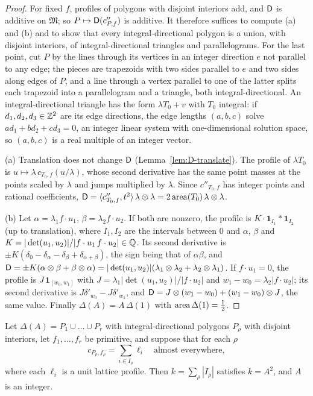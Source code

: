 \documentclass[11pt]{amsart}
\begin{document}
\begin{proof}
For fixed $f$, profiles of polygons with disjoint interiors add, and $\mathsf{D}$ is additive on $\mathfrak M$; so
$P\mapsto\mathsf{D}(c''_{P,f})$ is additive. It therefore suffices to compute (a) and (b) and to show that every
integral-directional polygon is a union, with disjoint interiors, of integral-directional triangles and
parallelograms. For the last point, cut $P$ by the lines through its vertices in an integer direction $e$ not
parallel to any edge; the pieces are trapezoids with two sides parallel to $e$ and two sides along edges of $P$, and
a line through a vertex parallel to one of the latter splits each trapezoid into a parallelogram and a triangle,
both integral-directional. An integral-directional triangle has the form $\lambda T_0+v$ with $T_0$ integral: if
$d_1,d_2,d_3\in\mathbb{Z}^2$ are its edge directions, the edge lengths $(a,b,c)$ solve $ad_1+bd_2+cd_3=0$, an integer linear
system with one-dimensional solution space, so $(a,b,c)$ is a real multiple of an integer vector.

(a) Translation does not change $\mathsf{D}$ (Lemma~\ref{lem:D-translate}). The profile of $\lambda T_0$ is
$u\mapsto\lambda\,c_{T_0,f}(u/\lambda)$, whose second derivative has the same point masses at the points scaled by
$\lambda$ and jumps multiplied by $\lambda$. Since $c''_{T_0,f}$ has integer points and rational coefficients,
$\mathsf{D}=\langle c''_{T_0,f},t^2\rangle\,\lambda\otimes\lambda=2\operatorname{area}(T_0)\,\lambda\otimes\lambda$.

(b) Let $\alpha=\lambda_1f\cdot u_1$, $\beta=\lambda_2f\cdot u_2$. If both are nonzero, the profile is
$K\cdot\mathbf 1_{I_1}*\mathbf 1_{I_2}$ (up to translation), where $I_1,I_2$ are the intervals between $0$ and
$\alpha$, $\beta$ and $K=|\det(u_1,u_2)|/|f\cdot u_1\,f\cdot u_2|\in\mathbb{Q}$. Its second derivative is
$\pm K(\delta_0-\delta_\alpha-\delta_\beta+\delta_{\alpha+\beta})$, the sign being that of $\alpha\beta$, and
$\mathsf{D}=\pm K(\alpha\otimes\beta+\beta\otimes\alpha)=|\det(u_1,u_2)|(\lambda_1\otimes\lambda_2+\lambda_2\otimes\lambda_1)$.
If $f\cdot u_1=0$, the profile is $J\,\mathbf 1_{[w_0,w_1]}$ with $J=\lambda_1|\det(u_1,u_2)|/|f\cdot u_2|$ and
$w_1-w_0=\lambda_2|f\cdot u_2|$; its second derivative is $J\delta'_{w_0}-J\delta'_{w_1}$, and
$\mathsf{D}=J\otimes(w_1-w_0)+(w_1-w_0)\otimes J$, the same value. Finally $\Delta(A)=A\,\Delta(1)$ with $\operatorname{area}\Delta(1)=\frac12$.
\end{proof}

\begin{theorem}\label{thm:tensor}
Let $\Delta(A)=P_1\cup\dots\cup P_r$ with integral-directional polygons $P_\rho$ with disjoint interiors, let
$f_1,\dots,f_r$ be primitive, and suppose that for each $\rho$
\[
c_{P_\rho,f_\rho}=\sum_{i\in I_\rho}\ell_i\quad\text{almost everywhere},
\]
where each $\ell_i$ is a unit lattice profile. Then $k=\sum_\rho|I_\rho|$ satisfies $k=A^2$, and $A$ is an
integer.
\end{theorem}
\end{document}

